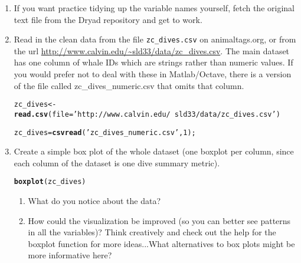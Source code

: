 \documentclass[12pt]{article}\usepackage[]{graphicx}\usepackage[]{color}
\makeatletter
\newcommand{\hlnum}[1]{\textcolor[rgb]{0.686,0.059,0.569}{#1}}%
\newcommand{\hlstr}[1]{\textcolor[rgb]{0.192,0.494,0.8}{#1}}%
\newcommand{\hlstd}[1]{\textcolor[rgb]{0.345,0.345,0.345}{#1}}%
\newcommand{\hlkwb}[1]{\textcolor[rgb]{0.69,0.353,0.396}{#1}}%
\newcommand{\hlkwc}[1]{\textcolor[rgb]{0.333,0.667,0.333}{#1}}%
\newcommand{\hlkwd}[1]{\textcolor[rgb]{0.737,0.353,0.396}{\textbf{#1}}}%
\newenvironment{kframe}{%
 \def\at@end@of@kframe{}%
 \ifinner\ifhmode%
  \def\at@end@of@kframe{\end{minipage}}%
  \begin{minipage}{\columnwidth}%
 \fi\fi%
 \def\FrameCommand##1{\hskip\@totalleftmargin \hskip-\fboxsep
 \colorbox{shadecolor}{##1}\hskip-\fboxsep
     \hskip-\linewidth \hskip-\@totalleftmargin \hskip\columnwidth}%
 \MakeFramed {\advance\hsize-\width
   \@totalleftmargin\z@ \linewidth\hsize
   \@setminipage}}%
 {\par\unskip\endMakeFramed%
 \at@end@of@kframe}
\newenvironment{knitrout}{}{} %
\makeatother
\begin{document}
\begin{enumerate}
\item If you want practice tidying up the variable names yourself, fetch the original text file from the Dryad repository and get to work.
\item Read in the clean data from the file \texttt{zc\_dives.csv} on animaltags.org, or from the url \url{http://www.calvin.edu/~sld33/data/zc\_dives.csv}.  The main dataset has one column of whale IDs which are strings rather than numeric values. If you would prefer not to deal with these in Matlab/Octave, there is a version of the file called zc\_dives\_numeric.csv that omits that column.

\begin{knitrout}
\color{fgcolor}\begin{kframe}
\begin{alltt}
\hlstd{zc_dives} \hlkwb{<-} \hlkwd{read.csv}\hlstd{(}\hlkwc{file}\hlstd{=}\hlstr{'http://www.calvin.edu/~sld33/data/zc_dives.csv'}\hlstd{)}
\end{alltt}
\end{kframe}
\end{knitrout}

\begin{knitrout}
\color{fgcolor}\begin{kframe}
\begin{alltt}
\hlstd{zc_dives} \hlkwb{=} \hlkwd{csvread}\hlstd{(}\hlstr{'zc_dives_numeric.csv'}\hlstd{,}\hlnum{1}\hlstd{);}
\end{alltt}
\end{kframe}
\end{knitrout}

\item Create a simple box plot of the whole dataset (one boxplot per column, since each column of the dataset is one dive summary metric).

\begin{knitrout}
\color{fgcolor}\begin{kframe}
\begin{alltt}
\hlkwd{boxplot}\hlstd{(zc_dives)}
\end{alltt}
\end{kframe}
\end{knitrout}

\begin{enumerate}
\item What do you notice about the data?
\item How could the visualization be improved (so you can better see patterns in all the variables)? Think creatively and check out the help for the boxplot function for more ideas...What alternatives to box plots might be more informative here?

\end{enumerate}

\end{enumerate}%
\end{document}
